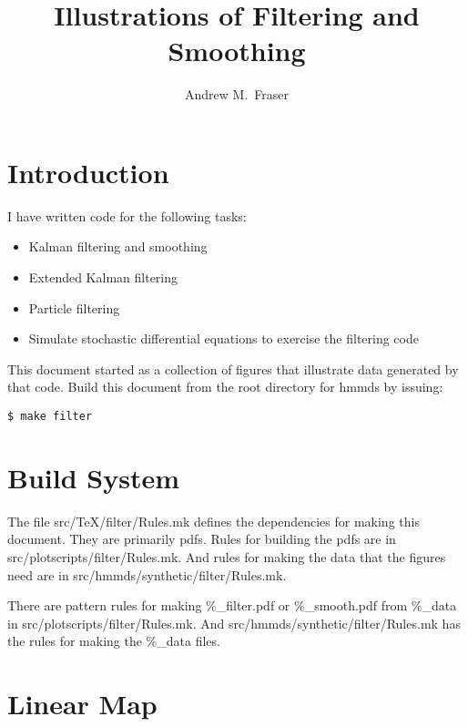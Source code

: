 \documentclass[12pt]{article}
\title{Illustrations of Filtering and Smoothing}
\author{Andrew M.\ Fraser}
\begin{document}
\maketitle

\section{Introduction}
\label{sec:introduction}

I have written code for the following tasks:
\begin{itemize}
\item Kalman filtering and smoothing
\item Extended Kalman filtering
\item Particle filtering
\item Simulate stochastic differential equations to exercise the
  filtering code
\end{itemize}
This document started as a collection of figures that illustrate data
generated by that code.  Build this document from the root directory
for hmmds by issuing:
\begin{verbatim}
$ make filter
\end{verbatim}

\section{Build System}

The file src/TeX/filter/Rules.mk defines the dependencies for making
this document.  They are primarily pdfs.  Rules for building the pdfs
are in src/plotscripts/filter/Rules.mk.  And rules for making the data
that the figures need are in src/hmmds/synthetic/filter/Rules.mk.

There are pattern rules for making \%\_filter.pdf or \%\_smooth.pdf from
\%\_data in src/plotscripts/filter/Rules.mk.  And
src/hmmds/synthetic/filter/Rules.mk has the rules for making the
\%\_data files.

\section{Linear Map}
\label{sec:linear_map}
\end{document}
